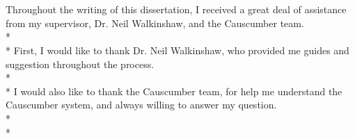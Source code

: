 \pagebreak
\section*{}
Throughout the writing of this dissertation, I received a great deal of assistance from my supervisor, Dr. Neil Walkinshaw, and the Causcumber team.\\*\\*
First, I would like to thank Dr. Neil Walkinshaw, who provided me guides and suggestion throughout the process. \\*\\*
I would also like to thank the Causcumber team, for help me understand the Causcumber system, and always willing to answer my question. \\*\\*
